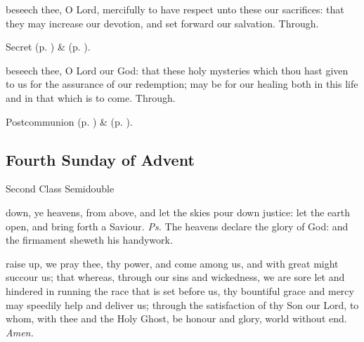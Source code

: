 
\secret
{} beseech thee, O Lord, mercifully to have respect unto these our sacrifices: that they may increase our devotion, and set forward our salvation. Through.

\begin{rubric}
     Secret  (p. \pageref{AdventISecret}) \&   (p. \pageref{SPMaryInAdvent}).
\end{rubric}


\postcommunion
{} beseech thee, O Lord our God: that these holy mysteries which thou hast given to us for the assurance of our redemption; may be for our healing both in this life and in that which is to come. Through.

\begin{rubric}
     Postcommunion  (p. \pageref{AdventIPostcommunion}) \&   (p. \pageref{SPMaryInAdvent}).
\end{rubric}

\clearpage
\subsection{Fourth Sunday of Advent}
\begin{inhead}
{Second Class Semidouble}
\end{inhead}
\fancyhead[RE,LO]{}


\introit
{} down, ye heavens, from above, and let the skies pour down justice: let the earth open, and bring forth a Saviour. \textit{Ps.} The heavens declare the glory of God: and the firmament sheweth his handywork.

\collect
{} raise up, we pray thee, thy power, and come among us, and with great might succour us; that whereas, through our sins and wickedness, we are sore let and hindered in running the race that is set before us, thy bountiful grace and mercy may speedily help and deliver us; through the satisfaction of thy Son our Lord, to whom, with thee and the Holy Ghost, be honour and glory, world without end. \textit{Amen.}


